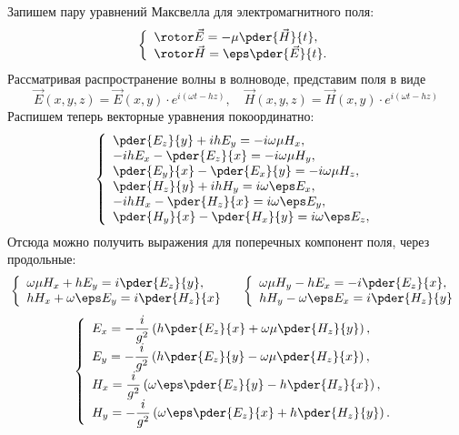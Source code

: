 \documentclass[a4paper]{article}
\renewcommand{\frac}{\dfrac}
\begin{document}
    Запишем пару уравнений Максвелла для электромагнитного поля:
    \[
        \left\{
        \begin{array}{l}
            \rotor\vec{E} = -\mu\pder{\vec{H}}{t},\\
            \rotor\vec{H} = \eps\pder{\vec{E}}{t}.
        \end{array}
        \right.
    \]
    Рассматривая распространение волны в волноводе, представим поля в виде
    \[
        \vec{E}(x,y,z) = \vec{E}(x,y) \cdot e^{i(\omega t - hz)},\quad
        \vec{H}(x,y,z) = \vec{H}(x,y) \cdot e^{i(\omega t - hz)}
    \]
    Распишем теперь векторные уравнения покоординатно:
    \[
        \left\{
            \begin{array}{l}
                \pder{E_z}{y} + ihE_y = -i\omega\mu H_x,\\
                -ihE_x - \pder{E_z}{x} = -i\omega\mu H_y,\\
                \pder{E_y}{x} - \pder{E_x}{y} = -i\omega\mu H_z,\\
                \pder{H_z}{y} + ihH_y = i\omega\eps E_x,\\
                -ihH_x - \pder{H_z}{x} = i\omega\eps E_y,\\
                \pder{H_y}{x} - \pder{H_x}{y} = i\omega\eps E_z,\\
            \end{array}
        \right.
    \]
    Отсюда можно получить выражения для поперечных компонент поля, через
    продольные:
    \[
        \left\{
        \begin{array}{l}
            \omega\mu H_x + h E_y = i\pder{E_z}{y},\\
            h H_x + \omega\eps E_y = i\pder{H_z}{x}
        \end{array}
        \right.
        \quad
        \left\{
        \begin{array}{l}
            \omega\mu H_y - h E_x = -i\pder{E_z}{x},\\
            h H_y - \omega\eps E_x = i\pder{H_z}{y}
        \end{array}
        \right.
    \]
    \[
        \left\{
        \begin{array}{l}
            E_x = -\frac{i}{g^2}\left( h\pder{E_z}{x} +
            \omega\mu\pder{H_z}{y} \right),\\
            E_y = -\frac{i}{g^2}\left( h\pder{E_z}{y} -
            \omega\mu\pder{H_z}{x} \right),\\
            H_x = \frac{i}{g^2}\left(
            \omega\eps\pder{E_z}{y} - h \pder{H_z}{x} \right),\\
            H_y = -\frac{i}{g^2}\left(
            \omega\eps\pder{E_z}{x} + h \pder{H_z}{y} \right).
        \end{array}
        \right.
    \]
\end{document}
